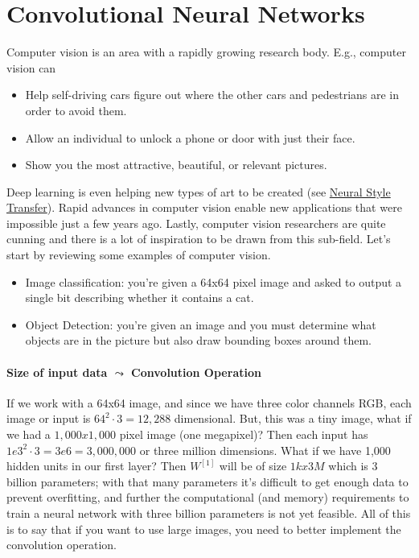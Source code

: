 \documentclass[12pt]{article}
\begin{document}
\section{Convolutional Neural Networks} Computer vision is an area with a rapidly growing research body. E.g.,
computer vision can
\begin{itemize} \item Help self-driving cars figure out where the other cars and pedestrians are in order to avoid them.
\item Allow an individual to unlock a phone or door with just their face.
\item Show you the most attractive, beautiful, or relevant pictures. \end{itemize}

Deep learning is even helping new types of art to be created (see \href{https://en.wikipedia.org/wiki/Neural_Style_Transfer}{Neural Style Transfer}). Rapid advances in computer vision enable new applications
that were impossible just a few years ago. Lastly, computer vision researchers are quite cunning and there is a lot of
inspiration to be drawn from this sub-field. Let's start by reviewing some examples of computer vision.
\begin{itemize}   \item Image classification: you're given a 64x64 pixel image and asked to output a single bit describing 
    whether it contains a cat.
  \item Object Detection: you're given an image and you must determine what objects are in the picture but also draw bounding boxes around them. \end{itemize}

\paragraph{Size of input data $\leadsto$ Convolution Operation} 
If we work with a 64x64 image, and since we have three color channels RGB, each image or input is
$64^2 \cdot 3 = 12,288$ dimensional. But, this was a tiny image, what if we had a $1,000 x 1,000$ pixel image (one megapixel)? Then
each input has $1e3^2 \cdot 3 = 3e6 = 3,000,000$ or three million dimensions. What if we have 1,000 hidden units in our first layer?
Then $W^{[1]}$ will be of size $1k x 3M$ which is 3 billion parameters; with that many parameters it's difficult to get enough
data to prevent overfitting, and further the computational (and memory) requirements to train a neural network with three billion
parameters is not yet feasible. All of this is to say that if you want to use large images, you need to better implement the
convolution operation.
\end{document}
